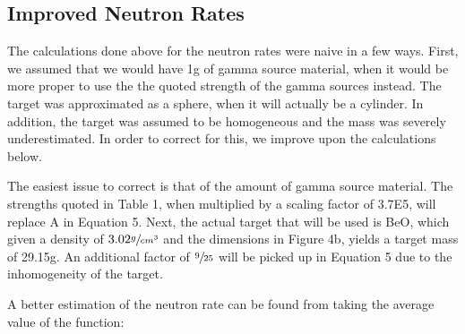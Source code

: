 \documentclass[%
12pt,
twoside,
reprint,
amsmath,amssymb,
aps,
]{article}
\begin{document}
	\subsection{Improved Neutron Rates}
	\par The calculations done above for the neutron rates were naive in a few ways. First, we assumed that we would have 1g of gamma source material, when it would be more proper to use the the quoted strength of the gamma sources instead. The target was approximated as a sphere, when it will actually be a cylinder. In addition, the target was assumed to be homogeneous and the mass was severely underestimated. In order to correct for this, we improve upon the calculations below.
	\par The easiest issue to correct is that of the amount of gamma source material. The strengths quoted in Table 1, when multiplied by a scaling factor of 3.7E5, will replace A in Equation 5. Next, the actual target that will be used is BeO, which given a density of $3.02 \sfrac{g}{cm^{3}}$ and the dimensions in Figure 4b, yields a target mass of 29.15g. An additional factor of $\sfrac{9}{25}$ will be picked up in Equation 5 due to the inhomogeneity of the target.
	\par A better estimation of the neutron rate can be found from taking the average value of the function:
	
\end{document}
